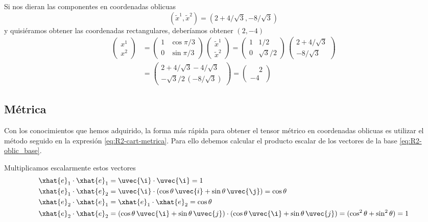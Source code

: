 Si nos dieran las componentes en coordenadas oblicuas
\[
  \left(\tilde{x}^1, \tilde{x}^2\right) = \left(2+4/\sqrt{3}, -8/\sqrt{3}\right)
\]
y quisiéramos obtener las coordenadas rectangulares, deberíamos obtener $(2,-4)$
\begin{align*}
  \begin{pmatrix}
    x^1\\
    x^2
  \end{pmatrix}
  &=
  \begin{pmatrix}
    1 & \cos{\pi/3}\\
    0 & \sin{\pi/3}
  \end{pmatrix}
  \,
  \begin{pmatrix}
    \tilde{x}^1\\
    \tilde{x}^2
  \end{pmatrix}
    =
  \begin{pmatrix}
    1 & 1/2\\
    0 & \sqrt{3}/2
  \end{pmatrix}
  \,
  \begin{pmatrix}
    2+4/\sqrt{3}\\
    -8/\sqrt{3}
  \end{pmatrix}\\
  &=
    \begin{pmatrix}
      2+4/\sqrt{3}-4/\sqrt{3}\\
      -\sqrt{3}/2\, \left(-8/\sqrt{3}\right)
    \end{pmatrix}
    =
    \begin{pmatrix}
      \phantom{-}2\\
      -4
    \end{pmatrix}  
\end{align*}


\subsection{Métrica}
Con los conocimientos que hemos adquirido, la forma más rápida para obtener el tensor
métrico en coordenadas oblicuas es utilizar el método seguido en la expresión
\eqref{eq:R2-cart-metrica}. Para ello debemos calcular el producto escalar de los
vectores de la base \eqref{eq:R2-oblic_base}.

Multiplicamos escalarmente estos vectores
\begin{subequations}
  \begin{align}
    \label{eq:R2-oblic-e1e1_prod_escalar}
    \xhat{e}_1\cdot\xhat{e}_1
    &=
      \uvec{\i}\cdot\uvec{\i} = 1\\
    \label{eq:R2-oblic-e1e2_prod_escalar}    
    \xhat{e}_1\cdot\xhat{e}_2
    &=
      \uvec{\i}\cdot (\cos\theta\,\uvec{i} + \sin\theta\,\uvec{\j}) = \cos\theta\\
    \label{eq:R2-oblic-e2e1_prod_escalar}
    \xhat{e}_2\cdot\xhat{e}_1
    &=
      \xhat{e}_1\cdot\xhat{e}_2 = \cos\theta\\
    \label{eq:R2-oblic-e2e2_prod_escalar}
    \xhat{e}_2\cdot\xhat{e}_2
    &=
      (\cos\theta\,\uvec{\i}+\sin\theta\,\uvec{j})
      \cdot (\cos\theta\,\uvec{\i}+\sin\theta\,\uvec{j})
      = (\cos^2\theta + \sin^2\theta) = 1
  \end{align}
\end{subequations}

